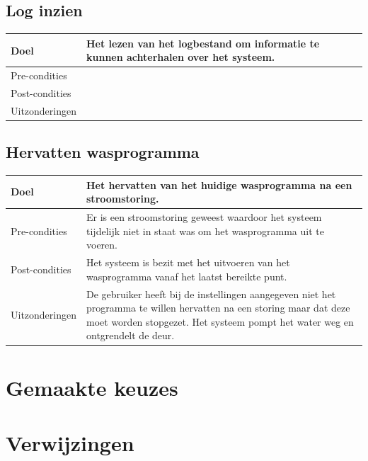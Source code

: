 	\subsection{Log inzien}
	\begin{center}
	  \begin{tabular}{ | p{4cm} | p{8.5cm} | }    \hline
		Doel & Het lezen van het logbestand om informatie te kunnen achterhalen over het systeem. \\ \hline
		Pre-condities & \\ \hline
		Post-condities & \\ \hline
		Uitzonderingen &  \\
		\hline
	  \end{tabular}
	\end{center}

	\subsection{Hervatten wasprogramma}
	\begin{center}
	  \begin{tabular}{ | p{4cm} | p{8.5cm} | }    \hline
		Doel & Het hervatten van het huidige wasprogramma na een stroomstoring. \\ \hline
		Pre-condities & Er is een stroomstoring geweest waardoor het systeem tijdelijk niet in staat was om het wasprogramma uit te voeren. \\ \hline
		Post-condities & Het systeem is bezit met het uitvoeren van het wasprogramma vanaf het laatst bereikte punt. \\ \hline
		Uitzonderingen & De gebruiker heeft bij de instellingen aangegeven niet het programma te willen hervatten na een storing maar dat deze moet worden stopgezet. Het systeem pompt het water weg en ontgrendelt de deur. \\
		\hline
	  \end{tabular}
	\end{center}

\section{Gemaakte keuzes}

\section{Verwijzingen}